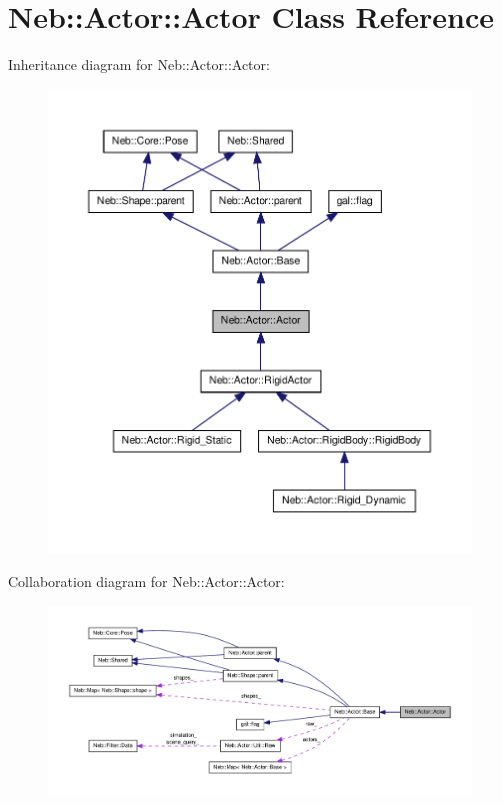 \hypertarget{classNeb_1_1Actor_1_1Actor}{\section{\-Neb\-:\-:\-Actor\-:\-:\-Actor \-Class \-Reference}
\label{classNeb_1_1Actor_1_1Actor}
}


\-Inheritance diagram for \-Neb\-:\-:\-Actor\-:\-:\-Actor\-:\nopagebreak
\begin{figure}[H]
\begin{center}
\leavevmode
\includegraphics[width=350pt]{classNeb_1_1Actor_1_1Actor__inherit__graph}
\end{center}
\end{figure}


\-Collaboration diagram for \-Neb\-:\-:\-Actor\-:\-:\-Actor\-:\nopagebreak
\begin{figure}[H]
\begin{center}
\leavevmode
\includegraphics[width=350pt]{classNeb_1_1Actor_1_1Actor__coll__graph}
\end{center}
\end{figure}
